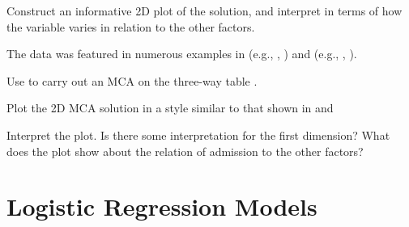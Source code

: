 \documentclass[10pt]{report}\usepackage[]{graphicx}\usepackage[]{color}
\begin{document}
\begin{Exercises}
\begin{enumerate*}
    \item Construct an informative 2D plot of the solution, and interpret in terms of how the variable 
    varies in relation to the other factors.
    \begin{ans}
    \end{ans}
    
  \end{enumerate*}

\exercise The  data was featured in numerous examples in 
(e.g., , )
and  (e.g., , ).
  \begin{enumerate*}
    \item Use  to carry out an MCA on the three-way table .
    \begin{ans}
    \end{ans}
    
    \item Plot the 2D MCA solution in a style similar to that shown in 
    and 
    \begin{ans}
    \end{ans}
    
    \item Interpret the plot.  Is there some interpretation for the first dimension?
    What does the plot show about the relation of admission to the other factors?
    \begin{ans}
    \end{ans}
    
  \end{enumerate*}

\end{Exercises}


\chapter{Logistic Regression Models}\label{ch:logistic}
\end{document}

